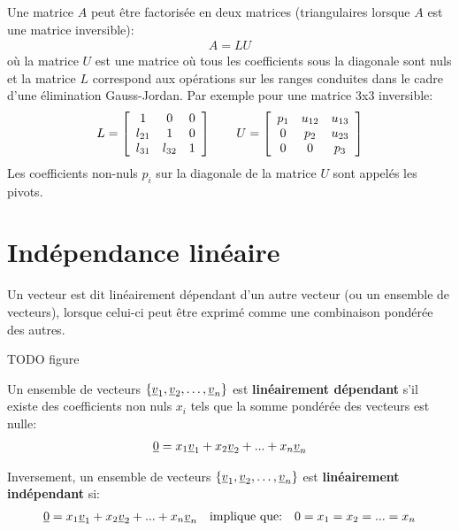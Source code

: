 Une matrice $A$ peut être factorisée en deux matrices (triangulaires lorsque $A$ est une matrice inversible):
%
\begin{align}
	A = LU
\end{align}
%
où la matrice $U$ est une matrice où tous les coefficients sous la diagonale sont nuls et la matrice $L$ correspond aux opérations sur les ranges conduites dans le cadre d'une élimination Gauss-Jordan. Par exemple pour une matrice 3x3 inversible:
%
\begin{align}
	L=
	\left[ \begin{array}{c c c }
			   1      &   0       & 0   \\
			   l_{21} &   1       & 0   \\
			   l_{31} & l_{32}    & 1
	\end{array} \right]
	\quad\quad
	U =
	\left[ \begin{array}{c c c c c }
			   p_{1} & u_{12} &  u_{13} \\
			   0     & p_{2}  &  u_{23}  \\
			   0     & 0      &  p_{3}
	\end{array} \right]
\end{align}
%
Les coefficients non-nuls $p_i$ sur la diagonale de la matrice $U$ sont appelés les pivots.

\section{Indépendance linéaire}
\label{sec:lindep}

Un vecteur est dit linéairement dépendant d'un autre vecteur (ou un ensemble de vecteurs), lorsque celui-ci peut être exprimé comme une combinaison pondérée des autres.

TODO figure

Un ensemble de vecteurs $\left\{ \underline{v}_1, \underline{v}_2, \hdots, \underline{v}_n \right\}$ est \textbf{linéairement dépendant} s'il existe des coefficients non nuls $x_i$ tels que la somme pondérée des vecteurs est nulle:
\begin{align}
	\underline{0} = x_1 \underline{v}_1 + x_2 \underline{v}_2 + ... + x_n \underline{v}_n
\end{align}

Inversement, un ensemble de vecteurs $\left\{ \underline{v}_1, \underline{v}_2, \hdots, \underline{v}_n \right\}$ est \textbf{linéairement indépendant} si:
\begin{align}
	\underline{0} = x_1 \underline{v}_1 + x_2 \underline{v}_2 + ... + x_n \underline{v}_n
	\quad
	\text{implique que:}
	\quad
	0 = x_1 = x_2 = ... = x_n
\end{align}

